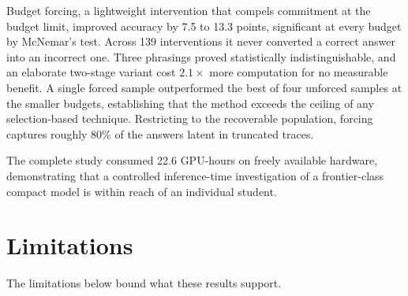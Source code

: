 \documentclass[12pt,a4paper,oneside]{report}
\begin{document}
Budget forcing, a lightweight intervention that compels commitment at the budget
limit, improved accuracy by 7.5 to 13.3 points, significant at every budget by
McNemar's test. Across 139 interventions it never converted a correct answer
into an incorrect one. Three phrasings proved statistically indistinguishable,
and an elaborate two-stage variant cost $2.1\times$ more computation for no
measurable benefit. A single forced sample outperformed the best of four
unforced samples at the smaller budgets, establishing that the method exceeds
the ceiling of any selection-based technique. Restricting to the recoverable
population, forcing captures roughly 80\% of the answers latent in truncated
traces.

The complete study consumed 22.6 GPU-hours on freely available hardware,
demonstrating that a controlled inference-time investigation of a frontier-class
compact model is within reach of an individual student.

\section{Limitations}

The limitations below bound what these results support.
\end{document}
